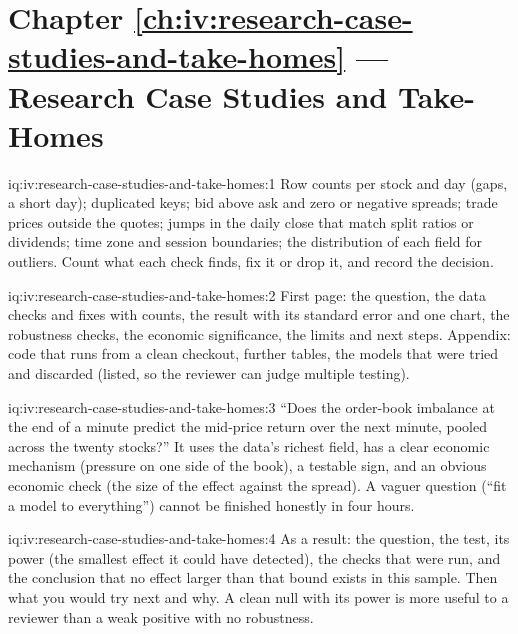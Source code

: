 \section*{Chapter \ref{ch:iv:research-case-studies-and-take-homes} --- Research Case Studies and Take-Homes}

\begin{solution}{iq:iv:research-case-studies-and-take-homes:1}
Row counts per stock and day (gaps, a short day); duplicated keys; bid above ask and zero or negative spreads; trade prices
outside the quotes; jumps in the daily close that match split ratios or dividends; time zone and session boundaries; the
distribution of each field for outliers. Count what each check finds, fix it or drop it, and record the decision.
\end{solution}

\begin{solution}{iq:iv:research-case-studies-and-take-homes:2}
First page: the question, the data checks and fixes with counts, the result with its standard error and one chart, the
robustness checks, the economic significance, the limits and next steps. Appendix: code that runs from a clean checkout,
further tables, the models that were tried and discarded (listed, so the reviewer can judge multiple testing).
\end{solution}

\begin{solution}{iq:iv:research-case-studies-and-take-homes:3}
``Does the order-book imbalance at the end of a minute predict the mid-price return over the next minute, pooled across the
twenty stocks?'' It uses the data's richest field, has a clear economic mechanism (pressure on one side of the book), a
testable sign, and an obvious economic check (the size of the effect against the spread). A vaguer question (``fit a model to
everything'') cannot be finished honestly in four hours.
\end{solution}

\begin{solution}{iq:iv:research-case-studies-and-take-homes:4}
As a result: the question, the test, its power (the smallest effect it could have detected), the checks that were run, and the
conclusion that no effect larger than that bound exists in this sample. Then what you would try next and why. A clean null
with its power is more useful to a reviewer than a weak positive with no robustness.
\end{solution}

